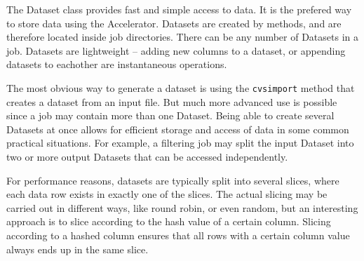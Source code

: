 
\label{chap:datasets}

The Dataset class provides fast and simple access to data.  It is the
prefered way to store data using the Accelerator.  Datasets are
created by methods, and are therefore located inside job directories.
There can be any number of Datasets in a job.  Datasets are
lightweight -- adding new columns to a dataset, or appending datasets
to eachother are instantaneous operations.

The most obvious way to generate a dataset is using the
\texttt{cvsimport} method that creates a dataset from an input file.
But much more advanced use is possible since a job may contain more
than one Dataset.  Being able to create several Datasets at once
allows for efficient storage and access of data in some common
practical situations.  For example, a filtering job may split the
input Dataset into two or more output Datasets that can be accessed
independently.

For performance reasons, datasets are typically split into several
slices, where each data row exists in exactly one of the slices.  The
actual slicing may be carried out in different ways, like round robin,
or even random, but an interesting approach is to slice according to
the hash value of a certain column.  Slicing according to a hashed
column ensures that all rows with a certain column value always ends
up in the same slice.



